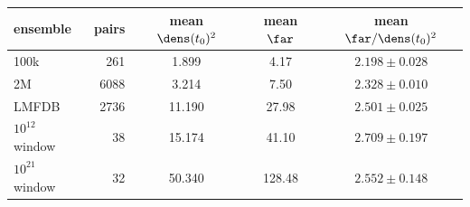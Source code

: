 \begin{tabular}{@{}lrccc@{}}
\toprule
ensemble & pairs & mean $\dens(t_{0})^{2}$ & mean $\far$ & mean $\far/\dens(t_{0})^{2}$\\
\midrule
100k & 261 & 1.899 & 4.17 & $2.198\pm0.028$\\
2M & 6088 & 3.214 & 7.50 & $2.328\pm0.010$\\
LMFDB & 2736 & 11.190 & 27.98 & $2.501\pm0.025$\\
$10^{12}$ window & 38 & 15.174 & 41.10 & $2.709\pm0.197$\\
$10^{21}$ window & 32 & 50.340 & 128.48 & $2.552\pm0.148$\\
\bottomrule
\end{tabular}
